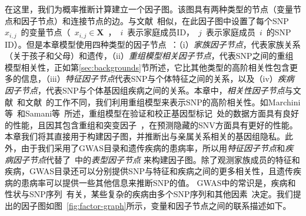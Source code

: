 在这里，我们为概率推断计算建立一个因子图。该图具有两种类型的节点（变量节点和因子节点）和连接节点的边。与文献~\cite{humbert2013addressing,humbert2017quantifying,deznabi2018inference}相似，在此因子图中设置了每个SNP ~$x_{i,j}$~的变量节点（~$x_{i,j}\in \mathbf{X}$~，~$i$~表示家庭成员ID，~$j$~表示家庭成员~$i$~的SNP ID）。但是本章模型使用四种类型的因子节点~\cite{deznabi2018inference}：（i）\emph{家族因子节点}，代表家族关系（关于孩子和父母）和遗传，（ii）\emph{重组模型相关因子节点}，代表SNP之间的重组模型相关性，正如第\ref{sec:backgrounds}节所述，它比其他类型的高阶相关性包含更多的信息，（iii）\emph{特征因子节点}代表SNP与个体特征之间的关系，以及（iv）\emph{疾病因子节点}，代表SNP与个体基因组疾病之间的关系。本章中，\emph{相关性因子节点}与文献~\cite{humbert2013addressing}和文献~\cite{deznabi2018inference}的工作不同，我们利用重组模型来表示SNP的高阶相关性。如Marchini等~\cite{marchini2007newa}和Samani等~\cite{samani2015quantifying}所述，重组模型在验证和校正基因型标记~\cite{marchini2007newa}处的数据方面具有良好的性能，且因其包含重组和突变因子~\cite{samani2015quantifying}，在预测隐藏的SNV方面具有更好的性能。本章我们将其直接用于构建因子图，并推断出与亲属关系相关的基因组隐私。此外，由于我们采用了GWAS目录和遗传疾病的患病率，所以用\emph{特征因子节点}和\emph{疾病因子节点}代替了~\cite{deznabi2018inference}中的\emph{表型因子节点} 来构建因子图。除了观测家族成员的特征和疾病，GWAS目录还可以分别提供SNP与特征和疾病之间的更多相关性，且遗传疾病的患病率可以提供一些其他信息来推断SNP的值。 GWAS中的常识是，疾病和性状与SNP序列~\cite{manolio2008a}有关，某些复杂的疾病由多个SNP序列和其他因素~\cite{climer2014a}决定。我们提出的因子图如图~\ref{fig:factor-graph}所示，变量和因子节点之间的联系描述如下。

